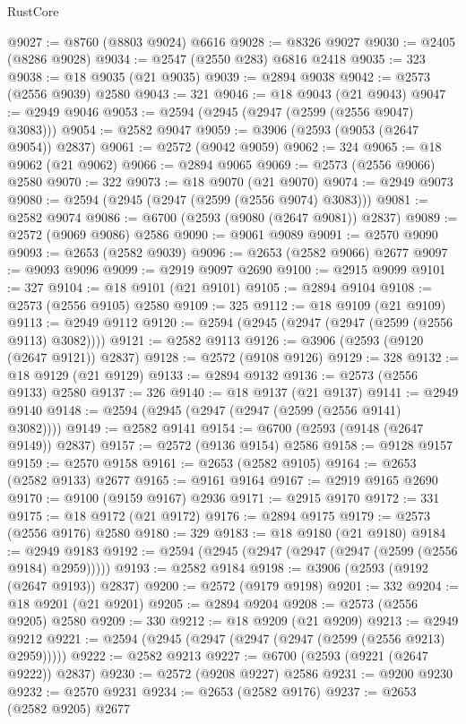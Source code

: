\begin{lexlean}{RustCore}
\begin{coremodule}
@9027 := @8760 (@8803 @9024) @6616
@9028 := @8326 @9027
@9030 := @2405 (@8286 @9028)
@9034 := @2547 (@2550 @283) @6816 @2418
@9035 := 323
@9038 := @18 @9035 (@21 @9035)
@9039 := @2894 @9038
@9042 := @2573 (@2556 @9039) @2580
@9043 := 321
@9046 := @18 @9043 (@21 @9043)
@9047 := @2949 @9046
@9053 := @2594 (@2945 (@2947 (@2599 (@2556 @9047) @3083)))
@9054 := @2582 @9047
@9059 := @3906 (@2593 (@9053 (@2647 @9054)) @2837)
@9061 := @2572 (@9042 @9059)
@9062 := 324
@9065 := @18 @9062 (@21 @9062)
@9066 := @2894 @9065
@9069 := @2573 (@2556 @9066) @2580
@9070 := 322
@9073 := @18 @9070 (@21 @9070)
@9074 := @2949 @9073
@9080 := @2594 (@2945 (@2947 (@2599 (@2556 @9074) @3083)))
@9081 := @2582 @9074
@9086 := @6700 (@2593 (@9080 (@2647 @9081)) @2837)
@9089 := @2572 (@9069 @9086) @2586
@9090 := @9061 @9089
@9091 := @2570 @9090
@9093 := @2653 (@2582 @9039)
@9096 := @2653 (@2582 @9066) @2677
@9097 := @9093 @9096
@9099 := @2919 @9097 @2690
@9100 := @2915 @9099
@9101 := 327
@9104 := @18 @9101 (@21 @9101)
@9105 := @2894 @9104
@9108 := @2573 (@2556 @9105) @2580
@9109 := 325
@9112 := @18 @9109 (@21 @9109)
@9113 := @2949 @9112
@9120 := @2594 (@2945 (@2947 (@2947 (@2599 (@2556 @9113) @3082))))
@9121 := @2582 @9113
@9126 := @3906 (@2593 (@9120 (@2647 @9121)) @2837)
@9128 := @2572 (@9108 @9126)
@9129 := 328
@9132 := @18 @9129 (@21 @9129)
@9133 := @2894 @9132
@9136 := @2573 (@2556 @9133) @2580
@9137 := 326
@9140 := @18 @9137 (@21 @9137)
@9141 := @2949 @9140
@9148 := @2594 (@2945 (@2947 (@2947 (@2599 (@2556 @9141) @3082))))
@9149 := @2582 @9141
@9154 := @6700 (@2593 (@9148 (@2647 @9149)) @2837)
@9157 := @2572 (@9136 @9154) @2586
@9158 := @9128 @9157
@9159 := @2570 @9158
@9161 := @2653 (@2582 @9105)
@9164 := @2653 (@2582 @9133) @2677
@9165 := @9161 @9164
@9167 := @2919 @9165 @2690
@9170 := @9100 (@9159 @9167) @2936
@9171 := @2915 @9170
@9172 := 331
@9175 := @18 @9172 (@21 @9172)
@9176 := @2894 @9175
@9179 := @2573 (@2556 @9176) @2580
@9180 := 329
@9183 := @18 @9180 (@21 @9180)
@9184 := @2949 @9183
@9192 := @2594 (@2945 (@2947 (@2947 (@2947 (@2599 (@2556 @9184) @2959)))))
@9193 := @2582 @9184
@9198 := @3906 (@2593 (@9192 (@2647 @9193)) @2837)
@9200 := @2572 (@9179 @9198)
@9201 := 332
@9204 := @18 @9201 (@21 @9201)
@9205 := @2894 @9204
@9208 := @2573 (@2556 @9205) @2580
@9209 := 330
@9212 := @18 @9209 (@21 @9209)
@9213 := @2949 @9212
@9221 := @2594 (@2945 (@2947 (@2947 (@2947 (@2599 (@2556 @9213) @2959)))))
@9222 := @2582 @9213
@9227 := @6700 (@2593 (@9221 (@2647 @9222)) @2837)
@9230 := @2572 (@9208 @9227) @2586
@9231 := @9200 @9230
@9232 := @2570 @9231
@9234 := @2653 (@2582 @9176)
@9237 := @2653 (@2582 @9205) @2677

\end{coremodule}
\end{lexlean}
